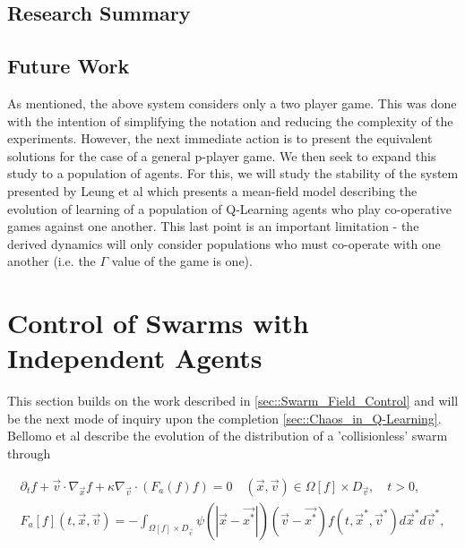 \documentclass[.../main.tex]{subfiles}
\begin{document}
    \subsection{Research Summary} %
    
    \subsection*{Future Work} \label{sec::Future Work}

    As mentioned, the above system considers only a two player game. This was done with the intention
    of simplifying the notation and reducing the complexity of the experiments. However, the next
    immediate action is to present the equivalent solutions for the case of a general p-player game.
    We then seek to expand this study to a population of agents. For this, we will study the
    stability of the system presented by Leung et al \cite{Leung} which presents a mean-field model
    describing the evolution of learning of a population of Q-Learning agents who play co-operative
    games against one another. This last point is an important limitation - the derived dynamics
    will only consider populations who must co-operate with one another (i.e. the $\Gamma$ value of
    the game is one). 

    \section{Control of Swarms with Independent Agents} \label{sec::Independent_Swarm_Control}
    
    This section builds on the work described in \ref{sec::Swarm_Field_Control} and will be the next
    mode of inquiry upon the completion \ref{sec::Chaos_in_Q-Learning}.
    Bellomo et al describe the evolution of the distribution of a 'collisionless' swarm
    through

    \begin{equation*}
    \begin{split}    
        \partial_t f + \Vec{v} \cdot \nabla_{\Vec{x}} f + \kappa \nabla_{\Vec{v}} \cdot (F_a (f) f)
        = 0 \quad  (\Vec{x}, \Vec{v}) \in \Omega[f] \times D_{\Vec{v}}, \quad t>0, \\
        F_a[f](t, \Vec{x}, \Vec{v}) = - \int_{\Omega [f] \times D_{\Vec{v}}} \psi (|\Vec{x} - \Vec
        {x^*}|)(\Vec{v} - \Vec{x^*}) f(t, \Vec{x}^*, \Vec{v}^*) d\Vec{x}^* d\Vec{v}^*, 
    \end{split}
    \end{equation*}
\end{document}
